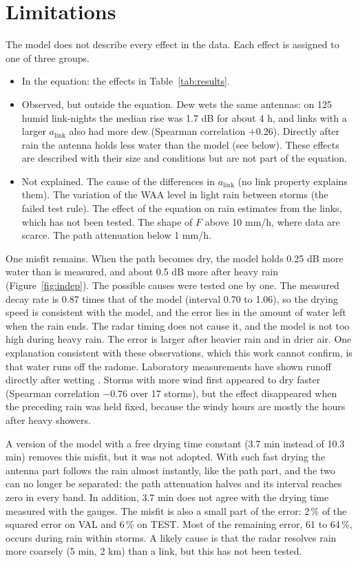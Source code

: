 \documentclass[11pt,a4paper]{article}
\newcommand{\alink}{a_{\mathrm{link}}}
\begin{document}
\section{Limitations}
\label{sec:cannot}
The model does not describe every effect in the data. Each effect is assigned to one of three groups.
\begin{itemize}[leftmargin=1.5em]
\item In the equation: the effects in Table~\ref{tab:results}.
\item Observed, but outside the equation. Dew wets the same antennas: on 125 humid link-nights the median rise was 1.7 dB for
about 4 h, and links with a larger $\alink$ also had more dew (Spearman correlation $+0.26$). Directly after rain the antenna
holds less water than the model (see below). These effects are described with their size and conditions but are not part of
the equation.
\item Not explained. The cause of the differences in $\alink$ (no link property explains them). The variation of the WAA level
in light rain between storms (the failed test rule). The effect of the equation on rain estimates from the links, which has not
been tested. The shape of $F$ above 10 mm/h, where data are scarce. The path attenuation below 1 mm/h.
\end{itemize}

One misfit remains. When the path becomes dry, the model holds 0.25 dB more water than is measured, and about 0.5 dB more after
heavy rain (Figure~\ref{fig:indep}). The possible causes were tested one by one. The measured decay rate is 0.87 times that of
the model (interval 0.70 to 1.06), so the drying speed is consistent with the model, and the error lies in the amount of water
left when the rain ends. The radar timing does not cause it, and the model is not too high during heavy rain. The error is
larger after heavier rain and in drier air. One explanation consistent with these observations, which this work cannot confirm,
is that water runs off the radome. Laboratory measurements have shown runoff directly after wetting \cite{tiede}. Storms with
more wind first appeared to dry faster (Spearman correlation $-0.76$ over 17 storms), but the effect disappeared when the
preceding rain was held fixed, because the windy hours are mostly the hours after heavy showers.

A version of the model with a free drying time constant (3.7 min instead of 10.3 min) removes this misfit, but it was not
adopted. With such fast drying the antenna part follows the rain almost instantly, like the path part, and the two can no longer
be separated: the path attenuation halves and its interval reaches zero in every band. In addition, 3.7 min does not agree with
the drying time measured with the gauges. The misfit is also a small part of the error: 2\,\% of the squared error on VAL and
6\,\% on TEST. Most of the remaining error, 61 to 64\,\%, occurs during rain within storms. A likely cause is that the radar
resolves rain more coarsely (5 min, 2 km) than a link, but this has not been tested.
\end{document}
